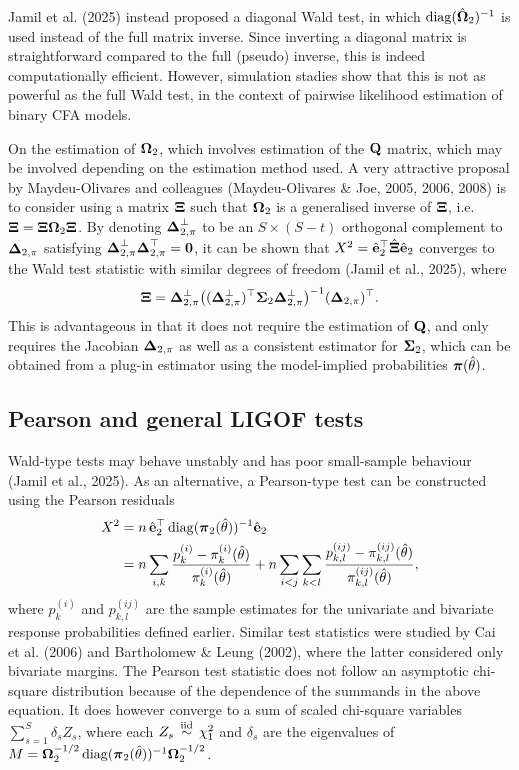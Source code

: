 \documentclass[
  letterpaper,
  DIV=11,
  numbers=noendperiod]{scrartcl}
\begin{document}
Jamil et al. (2025) instead proposed a diagonal Wald test, in which
\(\operatorname{diag}(\hat{{\boldsymbol\Omega}}_2)^{-1}\) is used instead of the full matrix
inverse. Since inverting a diagonal matrix is straightforward compared
to the full (pseudo) inverse, this is indeed computationally efficient.
However, simulation stadies show that this is not as powerful as the
full Wald test, in the context of pairwise likelihood estimation of
binary CFA models.

On the estimation of \({\boldsymbol\Omega}_2\), which involves estimation of the
\({\mathbf Q}\) matrix, which may be involved depending on the estimation method
used. A very attractive proposal by Maydeu-Olivares and colleagues
(Maydeu-Olivares \& Joe, 2005, 2006, 2008) is to consider using a matrix
\({\boldsymbol\Xi}\) such that \({\boldsymbol\Omega}_2\) is a generalised inverse of \({\boldsymbol\Xi}\),
i.e.~\({\boldsymbol\Xi} = {\boldsymbol\Xi} {\boldsymbol\Omega}_2 {\boldsymbol\Xi}\). By denoting
\({\boldsymbol\Delta}_{2,\pi}^\perp\) to be an \(S\times (S-t)\) orthogonal
complement to \({\boldsymbol\Delta}_{2,\pi}\) satisfying
\({\boldsymbol\Delta}_{2,\pi}^\perp {\boldsymbol\Delta}_{2,\pi}^\top = {\mathbf 0}\), it can be shown
that \(X^2 = \hat{{\mathbf e}}_2^\top \hat{{\boldsymbol\Xi}} \hat{{\mathbf e}}_2\) converges to the Wald
test statistic with similar degrees of freedom (Jamil et al., 2025),
where \[
{\boldsymbol\Xi} = {\boldsymbol\Delta}_{2,\pi}^\perp \big( ({\boldsymbol\Delta}_{2,\pi}^\perp)^\top {\boldsymbol\Sigma}_2 {\boldsymbol\Delta}_{2,\pi}^\perp \big)^{-1} ({\boldsymbol\Delta}_{2,\pi})^\top.
\] This is advantageous in that it does not require the estimation of
\({\mathbf Q}\), and only requires the Jacobian \({\boldsymbol\Delta}_{2,\pi}\) as well as a
consistent estimator for \({\boldsymbol\Sigma}_2\), which can be obtained from a
plug-in estimator using the model-implied probabilities
\({\boldsymbol\pi}(\hat\theta)\).

\subsection{Pearson and general LIGOF
tests}\label{pearson-and-general-ligof-tests}

Wald-type tests may behave unstably and has poor small-sample behaviour
(Jamil et al., 2025). As an alternative, a Pearson-type test can be
constructed using the Pearson residuals \[
\begin{aligned}
X^2 
&= n \, \hat{{\mathbf e}}_2^\top \operatorname{diag}({\boldsymbol\pi}_2(\hat\theta))^{-1} \hat{{\mathbf e}}_2 \\
&= 
n \sum_{i,k} \frac{p_k^{(i)} - \pi_k^{(i)}(\hat\theta)}{\pi_k^{(i)}(\hat\theta)} +
n \sum_{i<j}\sum_{k<l} \frac{p_{k,l}^{(ij)} - \pi_{k,l}^{(ij)}(\hat\theta)}{\pi_{k,l}^{(ij)}(\hat\theta)},
\end{aligned}
\] where \(p_k^{(i)}\) and \(p_{k,l}^{(ij)}\) are the sample estimates
for the univariate and bivariate response probabilities defined earlier.
Similar test statistics were studied by Cai et al. (2006) and
Bartholomew \& Leung (2002), where the latter considered only bivariate
margins. The Pearson test statistic does not follow an asymptotic
chi-square distribution because of the dependence of the summands in the
above equation. It does however converge to a sum of scaled chi-square
variables \(\sum_{s=1}^S \delta_s Z_s\), where each
\(Z_s \,\overset{\text{iid}}{\sim}\, \chi^2_1\) and \(\delta_s\) are the eigenvalues of
\(M={\boldsymbol\Omega}_2^{-1/2} \operatorname{diag}({\boldsymbol\pi}_2(\hat\theta))^{-1} {\boldsymbol\Omega}_2^{-1/2}\).
\end{document}
